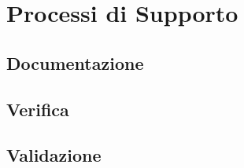 \section{Processi di Supporto}

\subsection{Documentazione}

\subsection{Verifica}

\subsection{Validazione}